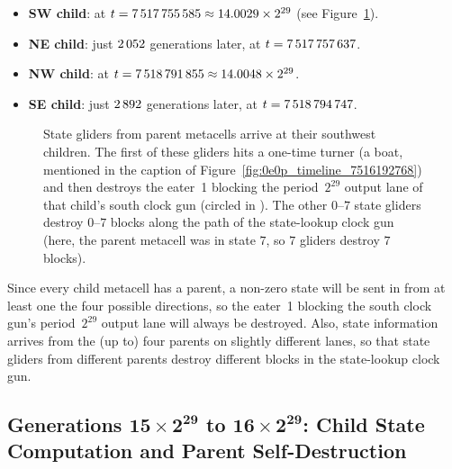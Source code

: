 \begin{itemize}
	\item \textbf{SW child}: at $t = 7{\,}517{\,}755{\,}585 \approx 14.0029 \times 2^{29}$ (see Figure~\ref{fig:0e0p_timeline_7517755585}).\smallskip
	
	\item \textbf{NE child}: just $2{\,}052$ generations later, at $t = 7{\,}517{\,}757{\,}637$.\smallskip
	
	\item \textbf{NW child}: at $t = 7{\,}518{\,}791{\,}855 \approx 14.0048 \times 2^{29}$.\smallskip
	
	\item \textbf{SE child}: just $2{\,}892$ generations later, at $t = 7{\,}518{\,}794{\,}747$.\smallskip
\end{itemize}

\begin{figure}[!htb]
	\centering
	\caption{State gliders from parent metacells arrive at their southwest children. The first of these gliders hits a one-time turner (a boat, mentioned in the caption of Figure~\ref{fig:0e0p_timeline_7516192768}) and then destroys the eater~1 blocking the period~$2^{29}$ output lane of that child's south clock gun (circled in ). The other $0$--$7$ state gliders destroy $0$--$7$ blocks along the path of the state-lookup clock gun (here, the parent metacell was in state $7$, so $7$ gliders destroy $7$ blocks).}
	\label{fig:0e0p_timeline_7517755585}
\end{figure}

Since every child metacell has a parent, a non-zero state will be sent in from at least one the four possible directions, so the eater~1 blocking the south clock gun's period~$2^{29}$ output lane will always be destroyed. Also, state information arrives from the (up to) four parents on slightly different lanes, so that state gliders from different parents destroy different blocks in the state-lookup clock gun.


\subsection{Generations $\mathbf{15 \times 2^{29}}$ to $\mathbf{16 \times 2^{29}}$: Child State Computation and Parent Self-Destruction}\label{sec:0e0p_timeline_self_dest}

